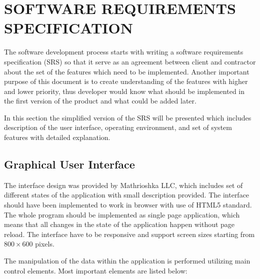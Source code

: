 \section{SOFTWARE REQUIREMENTS SPECIFICATION}

The software development process starts with writing a software requirements specification (SRS)
so that
it serve as an agreement between client and contractor about the set of the
features which need to be implemented. Another important purpose of this document
is to create understanding of the features with higher and lower priority, thus developer
would know what should be implemented in the first version of the product and what could
be added later.

In this section the simplified version of the SRS will be presented which includes description
of the user interface, operating environment, and set of system features with detailed
explanation.

\subsection{Graphical User Interface}

The interface design was provided by Mathrioshka LLC, which includes set of different states
of the application with small description provided. The interface should have been implemented
to work in browser with use of HTML5 standard. The whole program should be implemented
as single page application, which means that all changes in the state of the application
happen without page reload. The interface have to be responsive and support screen sizes
starting from $800 \times 600$ pixels.

The manipulation of the data within the application is performed utilizing main control elements.
Most important elements are listed below:

